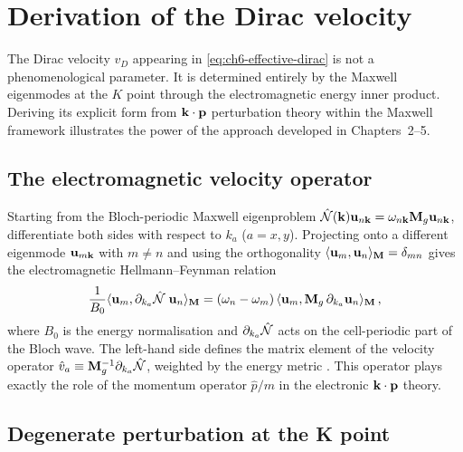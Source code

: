 \section{Derivation of the Dirac velocity}
\label{sec:ch6-vD-derivation}

The Dirac velocity $v_D$ appearing in \eqref{eq:ch6-effective-dirac}
is not a phenomenological parameter.  It is determined entirely by
the Maxwell eigenmodes at the $K$ point through the electromagnetic
energy inner product.  Deriving its explicit form from $\mathbf{k}\cdot\mathbf{p}$
perturbation theory within the Maxwell framework illustrates the
power of the approach developed in Chapters~2--5.

\subsection{The electromagnetic velocity operator}
\label{sec:ch6-velocity-operator}

Starting from the Bloch-periodic Maxwell eigenproblem
$\hat{\mathcal{N}}(\mathbf{k})\mathbf{u}_{n\mathbf{k}}=\omega_{n\mathbf{k}}\mathbf{M}_g\mathbf{u}_{n\mathbf{k}}$,
differentiate both sides with respect to $k_a$ ($a=x,y$).
Projecting onto a different eigenmode $\mathbf{u}_{m\mathbf{k}}$ with
$m\neq n$ and using the orthogonality
$\langle \mathbf{u}_m , \mathbf{u}_n \rangle_{\mathbf{M}}=\delta_{mn}$ gives the
electromagnetic Hellmann--Feynman relation
\begin{equation}\label{eq:ch6-HF-offdiag}
  \frac{1}{B_0}\langle \mathbf{u}_m , \partial_{k_a}\hat{\mathcal{N}}\;\mathbf{u}_n \rangle_{\mathbf{M}}
  = (\omega_n-\omega_m)\,
  \langle \mathbf{u}_m , \mathbf{M}_g\,\partial_{k_a}\mathbf{u}_n \rangle_{\mathbf{M}}\,,
\end{equation}
where $B_0$ is the energy normalisation and $\partial_{k_a}\hat{\mathcal{N}}$
acts on the cell-periodic part of the Bloch wave.  The left-hand side
defines the matrix element of the velocity operator
$\hat{v}_a\equiv\mathbf{M}_g^{-1}\partial_{k_a}\hat{\mathcal{N}}$, weighted by the
energy metric \cite{gangaraj2016berry}.  This operator plays exactly
the role of the momentum operator $\hat{p}/m$ in the electronic
$\mathbf{k}\cdot\mathbf{p}$ theory.

\subsection{Degenerate perturbation at the K point}
\label{sec:ch6-degenerate-kp}

